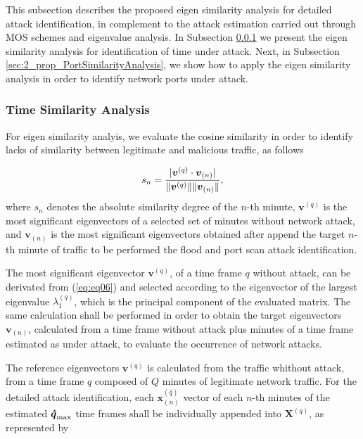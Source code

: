 This subsection describes the proposed eigen similarity analysis for detailed attack identification, in complement to the attack estimation carried out through MOS schemes and eigenvalue analysis. In Subsection \ref{sec:2_prop_TimeSimilarityAnalysis} we present the eigen similarity analysis for identification of time under attack. Next, in Subsection \ref{sec:2_prop_PortSimilarityAnalysis}, we show how to apply the eigen similarity analysis in order to identify network ports under attack.

\subsubsection{Time Similarity Analysis}
\label{sec:2_prop_TimeSimilarityAnalysis}

For eigen similarity analyis, we evaluate the cosine similarity in order to identify lacks of similarity between legitimate and malicious traffic, as follows

\begin{equation}\label{eq:eq11}
s_n = \frac{\lvert\boldsymbol{v}^{(q)} \cdot \boldsymbol{v}_{(n)}\rvert}{\lVert\boldsymbol{v}^{(q)}\rVert\lVert\boldsymbol{v}_{(n)}\rVert},
\end{equation}
where $s_n$ denotes the absolute similarity degree of the $n$-th minute, $\boldsymbol{v}^{(q)}$ is the most significant eigenvectors of a selected set of minutes without network attack, and $\boldsymbol{v}_{(n)}$ is the most significant eigenvectors obtained after append the target $n$-th minute of traffic to be performed the flood and port scan attack identification.

The most significant eigenvector $\boldsymbol{v}^{(q)}$, of a time frame $q$ without attack, can be derivated from (\ref{eq:eq06}) and selected according to the eigenvector of the largest eigenvalue $\lambda_1^{(q)}$, which is the principal component of the evaluated matrix. The same calculation shall be performed in order to obtain the target eigenvectors $\boldsymbol{v}_{(n)}$, calculated from a time frame without attack plus minutes of a time frame estimated as under attack, to evaluate the occurrence of network attacks. 

The reference eigenvectors $\boldsymbol{v}^{(q)}$ is calculated from the traffic whithout attack, from a time frame $q$ composed of $Q$ minutes of legitimate network traffic. For the detailed attack identification, each $\boldsymbol{x}^{(\hat{q})}_{(n)}$ vector of each $n$-th minutes of the estimated $\rm{\boldsymbol{\hat{q}}}_{\rm max}$ time frames shall be individually appended into $\boldsymbol{X}^{(q)}$, as represented by

